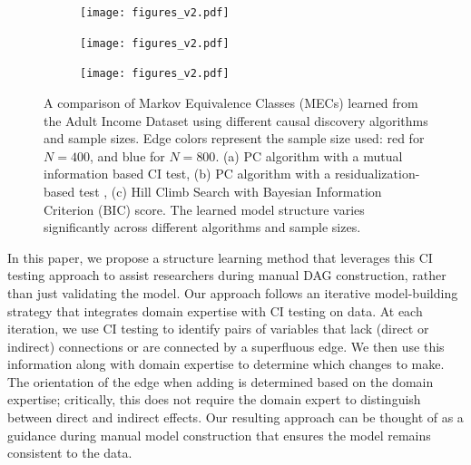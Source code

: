\documentclass[accepted]{uai2025} %
\begin{document}

\begin{figure}[t!]
    \begin{subfigure}{0.5 \textwidth}
	\centering
    	\texttt{[image: figures\_v2.pdf]}
    	\caption{}
    \end{subfigure}
    \begin{subfigure}{0.5\textwidth}
	\centering
    	\texttt{[image: figures\_v2.pdf]}
    	\caption{}
    \end{subfigure}
    \begin{subfigure}{0.5\textwidth}
	\centering
    	\texttt{[image: figures\_v2.pdf]}
    	\caption{}
    \end{subfigure}

    \caption{A comparison of Markov Equivalence Classes (MECs) learned from the Adult
	     Income Dataset \citep{Becker1996} using different causal discovery
	     algorithms and sample sizes. Edge colors represent the sample size
	     used: red for $N=400$, and blue for $N=800$. (a) PC algorithm with a
	     mutual information based CI test, (b) PC algorithm with a
    	     residualization-based test \citep{Ankan2023}, (c) Hill Climb Search with
	     Bayesian Information Criterion (BIC) score. The learned model structure varies
             significantly across different algorithms and sample sizes.}
    \label{fig:intro}
\end{figure}

In this paper, we propose a structure learning method that leverages this CI
testing approach to assist researchers during manual DAG construction, rather
than just validating the model. Our approach follows an iterative
model-building strategy that integrates domain expertise with CI testing on
data. At each iteration, we use CI testing to identify pairs of variables that
lack (direct or indirect) connections or are connected by a superfluous edge.
 We then use this information
along with domain expertise to determine which changes to make.
The orientation of the edge when adding is determined based on the domain
expertise; critically, this does not require the domain expert to distinguish 
between direct and indirect effects. Our resulting approach can be 
thought of as a guidance during manual model construction that ensures the 
model remains consistent to the data.
\end{document}

